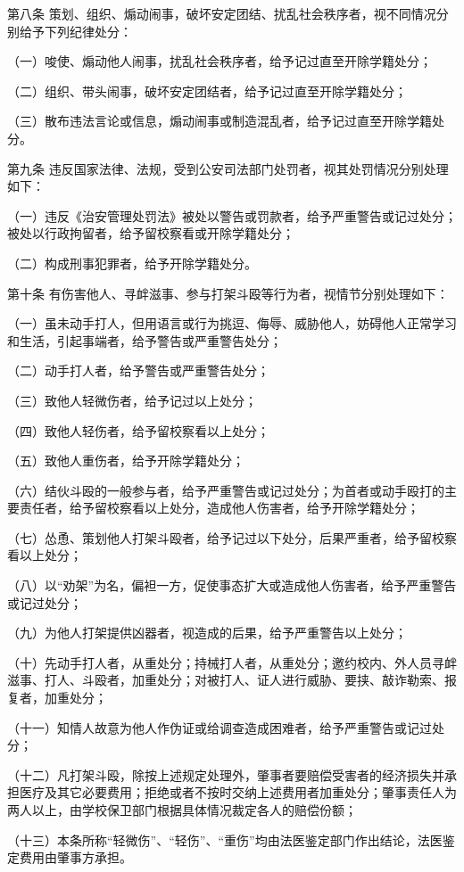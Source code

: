 \documentclass[UTF8,12pt,a4paper]{report}
\begin{document}
第八条  策划、组织、煽动闹事，破坏安定团结、扰乱社会秩序者，视不同情况分别给予下列纪律处分：

（一）唆使、煽动他人闹事，扰乱社会秩序者，给予记过直至开除学籍处分；

（二）组织、带头闹事，破坏安定团结者，给予记过直至开除学籍处分；

（三）散布违法言论或信息，煽动闹事或制造混乱者，给予记过直至开除学籍处分。

第九条  违反国家法律、法规，受到公安司法部门处罚者，视其处罚情况分别处理如下：

（一）违反《治安管理处罚法》被处以警告或罚款者，给予严重警告或记过处分；被处以行政拘留者，给予留校察看或开除学籍处分；

（二）构成刑事犯罪者，给予开除学籍处分。

第十条  有伤害他人、寻衅滋事、参与打架斗殴等行为者，视情节分别处理如下：

（一）虽未动手打人，但用语言或行为挑逗、侮辱、威胁他人，妨碍他人正常学习和生活，引起事端者，给予警告或严重警告处分；

（二）动手打人者，给予警告或严重警告处分；

（三）致他人轻微伤者，给予记过以上处分；

（四）致他人轻伤者，给予留校察看以上处分；

（五）致他人重伤者，给予开除学籍处分；

（六）结伙斗殴的一般参与者，给予严重警告或记过处分；为首者或动手殴打的主要责任者，给予留校察看以上处分，造成他人伤害者，给予开除学籍处分；

（七）怂恿、策划他人打架斗殴者，给予记过以下处分，后果严重者，给予留校察看以上处分；

（八）以“劝架”为名，偏袒一方，促使事态扩大或造成他人伤害者，给予严重警告或记过处分；

（九）为他人打架提供凶器者，视造成的后果，给予严重警告以上处分；

（十）先动手打人者，从重处分；持械打人者，从重处分；邀约校内、外人员寻衅滋事、打人、斗殴者，加重处分；对被打人、证人进行威胁、要挟、敲诈勒索、报复者，加重处分；

（十一）知情人故意为他人作伪证或给调查造成困难者，给予严重警告或记过处分；

（十二）凡打架斗殴，除按上述规定处理外，肇事者要赔偿受害者的经济损失并承担医疗及其它必要费用；拒绝或者不按时交纳上述费用者加重处分；肇事责任人为两人以上，由学校保卫部门根据具体情况裁定各人的赔偿份额；

（十三）本条所称“轻微伤”、“轻伤”、“重伤”均由法医鉴定部门作出结论，法医鉴定费用由肇事方承担。
\end{document}
